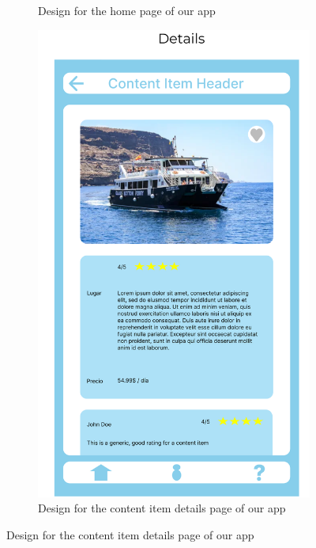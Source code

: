 \begin{figure}
\begin{subfigure}[T]{0.4\linewidth}
		\caption{Design for the home page of our app}
		\label{fig:homepage}
	\end{subfigure}
	\hfill
	\begin{subfigure}[T]{0.4\linewidth}
		\includegraphics[width=\linewidth]{figures/details.png}
		\caption{Design for the content item details page of our app}
		\label{fig:details}
	\end{subfigure}
\end{figure}

